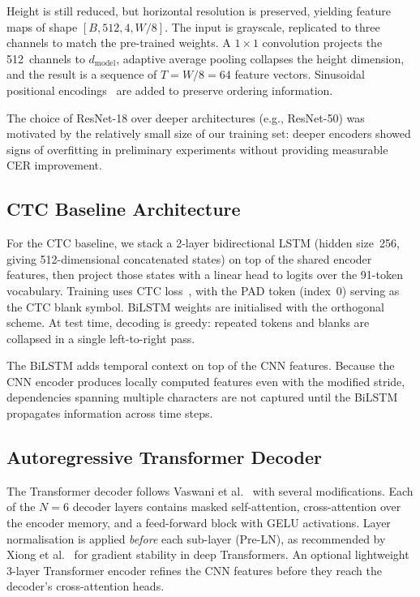 \documentclass[pdflatex,sn-mathphys-num]{sn-jnl}
\begin{document}
Height is still reduced, but horizontal resolution is preserved, yielding feature maps of shape $[B, 512, 4, W/8]$. The input is grayscale, replicated to three channels to match the pre-trained weights. A $1 \times 1$ convolution projects the 512~channels to $d_{\text{model}}$, adaptive average pooling collapses the height dimension, and the result is a sequence of $T = W/8 = 64$ feature vectors. Sinusoidal positional encodings~\cite{vaswani2017attention} are added to preserve ordering information.

The choice of ResNet-18 over deeper architectures (e.g., ResNet-50) was motivated by the relatively small size of our training set: deeper encoders showed signs of overfitting in preliminary experiments without providing measurable CER improvement.

\subsection{CTC Baseline Architecture}\label{sec:method:ctc}

For the CTC baseline, we stack a 2-layer bidirectional LSTM (hidden size~256, giving 512-dimensional concatenated states) on top of the shared encoder features, then project those states with a linear head to logits over the 91-token vocabulary. Training uses CTC loss~\cite{graves2006ctc}, with the PAD token (index~0) serving as the CTC blank symbol. BiLSTM weights are initialised with the orthogonal scheme. At test time, decoding is greedy: repeated tokens and blanks are collapsed in a single left-to-right pass.

The BiLSTM adds temporal context on top of the CNN features. Because the CNN encoder produces locally computed features even with the modified stride, dependencies spanning multiple characters are not captured until the BiLSTM propagates information across time steps.

\subsection{Autoregressive Transformer Decoder}\label{sec:method:ar}

The Transformer decoder follows Vaswani et al.~\cite{vaswani2017attention} with several modifications. Each of the $N = 6$ decoder layers contains masked self-attention, cross-attention over the encoder memory, and a feed-forward block with GELU activations. Layer normalisation is applied \textit{before} each sub-layer (Pre-LN), as recommended by Xiong et al.~\cite{xiong2020layer} for gradient stability in deep Transformers. An optional lightweight 3-layer Transformer encoder refines the CNN features before they reach the decoder's cross-attention heads.
\end{document}

